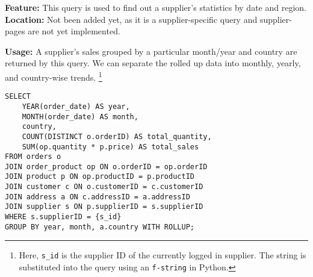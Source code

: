 \textbf{Feature:} This query is used to find out a supplier's statistics by date and region. \\
\textbf{Location:} Not been added yet, as it is a supplier-specific query and supplier-pages are not yet implemented.

\textbf{Usage:}
A supplier's sales grouped by a particular month/year and country are returned by this query.
We can separate the rolled up data into monthly, yearly, and country-wise trends.
\footnote{
    Here, \texttt{s\_id} is the supplier ID of the currently logged in supplier.
    The string is substituted into the query using an \texttt{f-string} in Python.
}

\begin{lstlisting}
SELECT
    YEAR(order_date) AS year,
    MONTH(order_date) AS month,
    country,
    COUNT(DISTINCT o.orderID) AS total_quantity,
    SUM(op.quantity * p.price) AS total_sales
FROM orders o
JOIN order_product op ON o.orderID = op.orderID
JOIN product p ON op.productID = p.productID
JOIN customer c ON o.customerID = c.customerID
JOIN address a ON c.addressID = a.addressID
JOIN supplier s ON p.supplierID = s.supplierID
WHERE s.supplierID = {s_id}
GROUP BY year, month, a.country WITH ROLLUP;
\end{lstlisting}